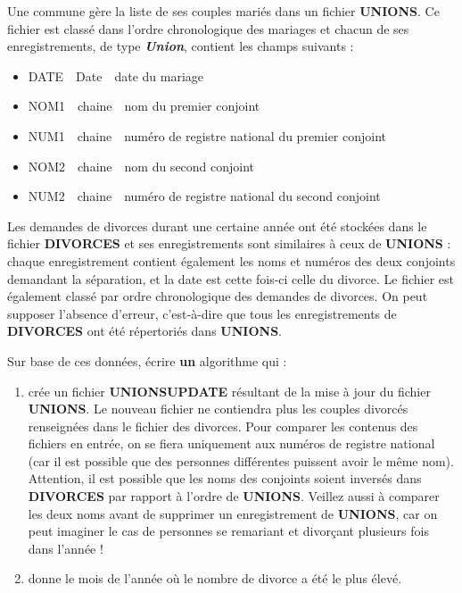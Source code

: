 \bigskip

{
{Une commune gère la liste de ses couples mariés
dans un fichier
}{\textbf{UNIONS}}{. Ce
fichier est classé dans l’ordre chronologique des mariages et chacun de
ses enregistrements, de type
}{\textbf{\textit{Union}}}{,
contient les champs suivants :}}

\liststyleListi
\begin{itemize}
\item {
DATE\ \ Date\ \ date du mariage}
\item {
NOM1\ \ chaine\ \ nom du premier conjoint}
\item {
NUM1\ \ chaine\ \ numéro de registre national du premier conjoint}
\item {
NOM2\ \ chaine\ \ nom du second conjoint}
\item {
NUM2\ \ chaine\ \ numéro de registre national du second conjoint}
\end{itemize}
{
{Les demandes de divorces durant une certaine
année ont été stockées dans le fichier
}{\textbf{DIVORCES}}{
et ses enregistrements sont similaires à ceux de
}{\textbf{UNIONS}}{ :
chaque enregistrement contient également les noms et numéros des deux
conjoints demandant la séparation, et la date est cette fois-ci celle
du divorce. Le fichier est également classé par ordre chronologique des
demandes de divorces. On peut supposer l’absence d’erreur, c’est-à-dire
que tous les enregistrements de
}{\textbf{DIVORCES}}{
ont été répertoriés dans
}{\textbf{UNIONS}}{.}}

{
{Sur base de ces données, écrire
}{\textbf{un}}{
algorithme qui :}}

\liststyleNumberingi
\begin{enumerate}
\item {
{crée un fichier
}{\textbf{UNIONSUPDATE}}{
résultant de la mise à jour du fichier
}{\textbf{UNIONS}}{. Le
nouveau fichier ne contiendra plus les couples divorcés renseignées
dans le fichier des divorces. Pour comparer les contenus des fichiers
en entrée, on se fiera uniquement aux numéros de registre national (car
il est possible que des personnes différentes puissent avoir le même
nom). Attention, il est possible que les noms des conjoints soient
inversés dans
}{\textbf{DIVORCES}}{
par rapport à l’ordre de
}{\textbf{UNIONS}}{.
Veillez aussi à comparer les deux noms avant de supprimer un
enregistrement de
}{\textbf{UNIONS}}{,
car on peut imaginer le cas de personnes se remariant et divorçant
plusieurs fois dans l’année !}}
\item {
donne le mois de l’année où le nombre de divorce a été le plus élevé.}
\end{enumerate}

